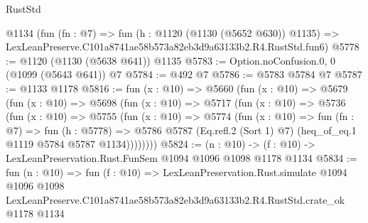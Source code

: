 \begin{lexlean}{RustStd}
\begin{coremodule}
    @1134
    (fun (fn : @7) =>
    fun (h : @1120 (@1130 (@5652 @630)) @1135) =>
    LexLeanPreserve.C101a8741ae58b573a82eb3d9a63133b2.R4.RustStd.fun6)
@5778 := @1120 (@1130 (@5638 @641)) @1135
@5783 := Option.noConfusion.{0, 0} (@1099 (@5643 @641)) @7
@5784 := @492 @7
@5786 := @5783 @5784 @7
@5787 := @1133 @1178
@5816 := fun (x : @10) =>
  @5660
    (fun (x : @10) =>
    @5679
      (fun (x : @10) =>
      @5698
        (fun (x : @10) =>
        @5717
          (fun (x : @10) =>
          @5736
            (fun (x : @10) =>
            @5755
              (fun (x : @10) =>
              @5774
                (fun (x : @10) =>
                fun (fn : @7) =>
                fun (h : @5778) =>
                @5786 @5787 (Eq.refl.{2} (Sort 1) @7) (heq_of_eq.{1} @1119 @5784 @5787 @1134))))))))
@5824 := (n : @10) -> (f : @10) -> LexLeanPreservation.Rust.FunSem @1094 @1096 @1098 @1178 @1134
@5834 := fun (n : @10) =>
  fun (f : @10) =>
  LexLeanPreservation.Rust.simulate
    @1094
    @1096
    @1098
    LexLeanPreserve.C101a8741ae58b573a82eb3d9a63133b2.R4.RustStd.crate_ok
    @1178
    @1134
\end{coremodule}
\end{lexlean}
